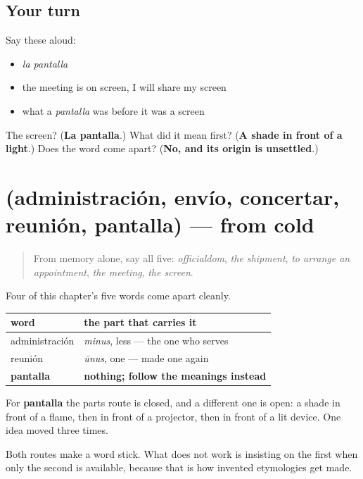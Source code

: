\subsection*{Your turn}
Say these aloud:

\begin{itemize}
\raggedright
  \item \emph{la pantalla}
  \item the meeting is on screen, I will share my screen
  \item what a \emph{pantalla} was before it was a screen
\end{itemize}

\begin{tcolorbox}[breakable,colback=teal!4,colframe=teal!35!black,title={Before you move on}]
The screen? (\textbf{La pantalla}.) What did it mean first? (\textbf{A shade in front of a light}.) Does the word come apart? (\textbf{No, and its origin is unsettled}.)
\end{tcolorbox}
\section[(administración, envío, concertar …]{(administración, envío, concertar, reunión, pantalla) — from cold}

\label{lesson:ES-R442-repaso-gestion}



\begin{quote}
From memory alone, say all five: \emph{officialdom}, \emph{the shipment}, \emph{to arrange an appointment}, \emph{the meeting}, \emph{the screen}.
\end{quote}

\begin{grammarlens}[title={Grammar Lens: two routes into a word, and when each one runs out}]
Four of this chapter's five words come apart cleanly.

\noindent
\begin{tabularx}{\linewidth}{@{}>{\raggedright\arraybackslash}X>{\raggedright\arraybackslash}X@{}}
\toprule
\textbf{word} & \textbf{the part that carries it} \\
\midrule
administración & \emph{minus}, less — the one who serves \\
reunión & \emph{ūnus}, one — made one again \\
\textbf{pantalla} & \textbf{nothing; follow the meanings instead} \\
\bottomrule
\end{tabularx}

For \textbf{pantalla} the parts route is closed, and a different one is open: a shade in front of a flame, then in front of a projector, then in front of a lit device. One idea moved three times.

Both routes make a word stick. What does not work is insisting on the first when only the second is available, because that is how invented etymologies get made.
\end{grammarlens}

